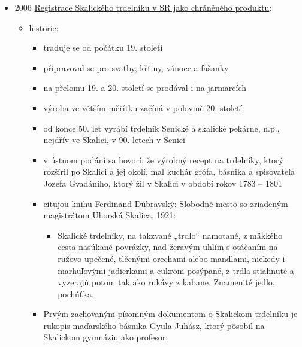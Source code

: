 \begin{itemize}
  \begin{itemize}
  \tightlist
  \item
    průvodce expozicí muzea
  \item
    není online,
  \item
    s. 191:

    \begin{itemize}
    \tightlist
    \item
      lidová strava
    \item
      hliněných formách - babůvkách, dále beléše - vdolky pečené na
      plotně, trdelníky - velké trubičky sypané posýpkou s ořechy, které
      se dlouho pekly nad ohněm, později ve formě stavěné na plech
    \end{itemize}
  \end{itemize}
\item
  2006
  \href{https://www.indprop.gov.sk/swift_data/source/pdf/specifikacie_op_oz/skalicky_trdelnik.pdf}{Registrace
  Skalického trdelníku v SR jako chráněného produktu}:

  \begin{itemize}
  \tightlist
  \item
    historie:

    \begin{itemize}
    \tightlist
    \item
      traduje se od počátku 19. století
    \item
      připravoval se pro svatby, křtiny, vánoce a fašanky
    \item
      na přelomu 19. a 20. století se prodával i na jarmarcích
    \item
      výroba ve větším měřítku začíná v polovině 20. století
    \item
      od konce 50. let vyrábí trdelník Senické a skalické pekárne, n.p.,
      nejdřív ve Skalici, v 90. letech v Senici
    \item
      v ústnom podání sa hovorí, že výrobný recept na trdelníky, ktorý
      rozšíril po Skalici a jej okolí, mal kuchár grófa, básnika a
      spisovateľa Jozefa Gvadániho, ktorý žil v Skalici v období rokov
      1783 -- 1801
    \item
      citujou knihu Ferdinand Dúbravský: Slobodné mesto so zriadeným
      magistrátom Uhorská Skalica, 1921:

      \begin{itemize}
      \tightlist
      \item
        Skalické trdelníky, na takzvané „trdlo`` namotané, z mäkkého
        cesta nasúkané povrázky, nad žeravým uhlím s otáčaním na ružovo
        upečené, tlčenými orechami alebo mandlami, niekedy i marhuľovými
        jadierkami a cukrom posýpané, z trdla stiahnuté a vyzerajú potom
        tak ako rukávy z kabane. Znamenité jedlo, pochúťka.
      \end{itemize}
    \item
      Prvým zachovaným písomným dokumentom o Skalickom trdelníku je
      rukopis maďarského básnika Gyula Juhász, ktorý pôsobil na
      Skalickom gymnáziu ako profesor:


\end{itemize}
\end{itemize}
\end{itemize}
